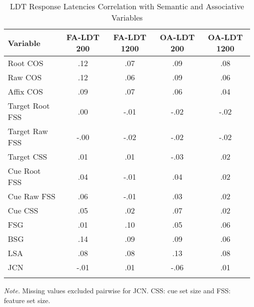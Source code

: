\documentclass[english,man]{apa6}
\theoremstyle{definition}
\theoremstyle{definition}
\theoremstyle{definition}
\theoremstyle{remark}
\begin{document}
\begin{table}[tbp]
\begin{center}
\begin{threeparttable}
\caption{\label{tab:ldt-table}LDT Response Latencies Correlation with Semantic and Associative Variables}
\begin{tabular}{lcccc}
\toprule
Variable & \multicolumn{1}{c}{FA-LDT 200} & \multicolumn{1}{c}{FA-LDT 1200} & \multicolumn{1}{c}{OA-LDT 200} & \multicolumn{1}{c}{OA-LDT 1200}\\
\midrule
Root COS & .12 & .07 & .09 & .08\\
Raw COS & .12 & .06 & .09 & .06\\
Affix COS & .09 & .07 & .06 & .04\\
Target Root FSS & .00 & -.01 & -.02 & -.02\\
Target Raw FSS & -.00 & -.02 & -.02 & -.02\\
Target CSS & .01 & .01 & -.03 & .02\\
Cue Root FSS & .04 & -.01 & .04 & .02\\
Cue Raw FSS & .06 & -.01 & .03 & .02\\
Cue CSS & .05 & .02 & .07 & .02\\
FSG & .01 & .10 & .05 & .06\\
BSG & .14 & .09 & .09 & .06\\
LSA & .08 & .08 & .13 & .08\\
JCN & -.01 & .01 & -.06 & .01\\
\bottomrule
\addlinespace
\end{tabular}
\begin{tablenotes}[para]
\textit{Note.} Missing values excluded pairwise for JCN. CSS: cue set size and FSS: feature set size.
\end{tablenotes}
\end{threeparttable}
\end{center}
\end{table}
\end{document}
